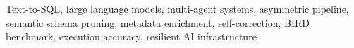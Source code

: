 \documentclass[conference]{IEEEtran}
\begin{document}
\begin{IEEEkeywords}
    Text-to-SQL, large language models, multi-agent systems, asymmetric pipeline, semantic schema pruning, metadata enrichment, self-correction, BIRD benchmark, execution accuracy, resilient AI infrastructure
\end{IEEEkeywords}











\end{document}

